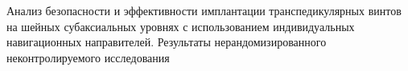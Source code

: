 
Анализ безопасности и эффективности имплантации транспедикулярных
винтов на шейных субаксиальных уровнях с использованием индивидуальных
навигационных направителей. Результаты нерандомизированного
неконтролируемого исследования 
